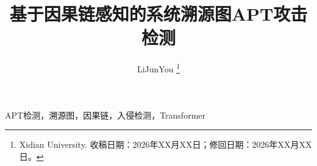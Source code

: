 \documentclass[lettersize,journal]{IEEEtran}
\title{基于因果链感知的系统溯源图APT攻击检测}
\author{LiJunYou%
\thanks{Xidian University. 收稿日期：2026年XX月XX日；修回日期：2026年XX月XX日。}}
\begin{document}
\maketitle

\begin{abstract}

\end{abstract}

\begin{IEEEkeywords}
APT检测，溯源图，因果链，入侵检测，Transformer
\end{IEEEkeywords}











\end{document}
